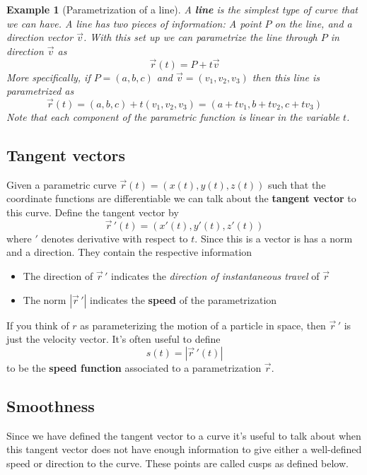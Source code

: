 \documentclass[12pt]{article}
\numberwithin{equation}{subsection}
\numberwithin{figure}{subsection}
\theoremstyle{note}
\newtheorem{example}[subsection]{Example}
\begin{document}
{\begin{example}[Parametrization of a line]
A \textbf{line} is the simplest type of curve that we can have. A line has two pieces of information: A point $P$ on the line, and a direction vector $\vec{v}$. With this set up we can parametrize the line through $P$ in direction $\vec{v}$ as \begin{equation} \vec{r}(t)=P+t\vec{v}\end{equation}
More specifically, if $P=(a,b,c)$ and $\vec{v}=(v_1,v_2,v_3)$ then this line is parametrized as \[ \vec{r}(t)=(a,b,c)+t(v_1,v_2,v_3)=(a+tv_1,b+tv_2, c+tv_3)\] 
Note that each component of the parametric function is \textit{linear} in the variable $t$. 
\end{example}

\subsection{Tangent vectors} 

Given a parametric curve $\vec{r}(t)=(x(t),y(t),z(t))$ such that the coordinate functions are differentiable we can talk about the \textbf{tangent vector} to this curve. Define the tangent vector by \begin{equation} \vec{r}\,'(t)=(x'(t),y'(t),z'(t))\end{equation} where $'$ denotes derivative with respect to $t$. Since this is a vector is has a norm and a direction. They contain the respective information \begin{itemize}
	\item The direction of $\vec{r}\,'$ indicates the \textit{direction of instantaneous travel} of $\vec{r}$ 
	\item The norm $|\vec{r}\,'|$ indicates the \textbf{speed} of the parametrization
\end{itemize}
If you think of $r$ as parameterizing the motion of a particle in space, then $\vec{r}\,'$ is just the velocity vector. It's often useful to define \begin{equation} s(t)=|\vec{r}\,'(t)|\end{equation} to be the \textbf{speed function} associated to a parametrization $\vec{r}$.

\subsection{Smoothness} \label{sec-smooth}
Since we have defined the tangent vector to a curve it's useful to talk about when this tangent vector does not have enough information to give either a well-defined speed or direction to the curve. These points are called cusps as defined below.

}
\end{document}
